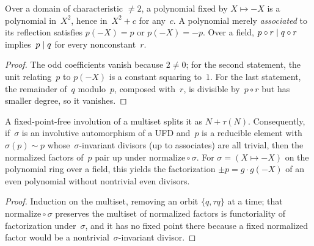 \begin{lemma}
  \label{lem:evenpoly}
  \leanok
  Over a domain of characteristic $\ne 2$, a polynomial fixed by $X \mapsto -X$ is a polynomial
  in~$X^2$, hence in~$X^2 + c$ for any~$c$. A polynomial merely \emph{associated} to its
  reflection satisfies $p(-X) = p$ or $p(-X) = -p$. Over a field, $p \circ r \mathrel{\mid} q \circ r$
  implies~$p \mathrel{\mid} q$ for every nonconstant~$r$.
\end{lemma}
\begin{proof}
  \leanok
  The odd coefficients vanish because $2 \ne 0$; for the second statement, the unit relating~$p$
  to $p(-X)$ is a constant squaring to~$1$. For the last statement, the remainder of~$q$
  modulo~$p$, composed with~$r$, is divisible by~$p \circ r$ but has smaller degree, so it vanishes.
\end{proof}

\begin{lemma}
  \label{lem:involution}
  \leanok
  A fixed-point-free involution of a multiset splits it as $N + \tau(N)$. Consequently,
  if~$\sigma$ is an involutive automorphism of a UFD and~$p$ is a reducible element with
  $\sigma(p) \sim p$ whose~$\sigma$-invariant divisors (up to associates) are all trivial, then
  the normalized factors of~$p$ pair up under $\mathrm{normalize} \circ \sigma$. For
  $\sigma = (X \mapsto -X)$ on the polynomial ring over a field, this yields the factorization
  $\pm p = g \cdot g(-X)$ of an even polynomial without nontrivial even divisors.
\end{lemma}
\begin{proof}
  \leanok
  Induction on the multiset, removing an orbit $\{q, \tau q\}$ at a time; that
  $\mathrm{normalize} \circ \sigma$ preserves the multiset of normalized factors is
  functoriality of factorization under~$\sigma$, and it has no fixed point there because a fixed
  normalized factor would be a nontrivial~$\sigma$-invariant divisor.
\end{proof}
